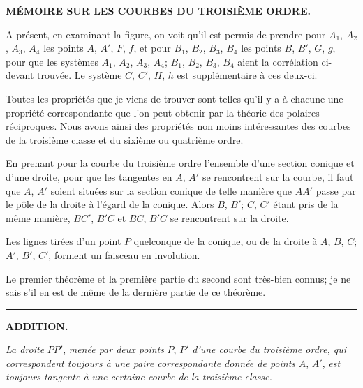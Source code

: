 \documentclass[11pt,a4paper]{book}
\begin{document}
\begin{center}
{\large\bfseries M\'{E}MOIRE SUR LES COURBES DU TROISI\`{E}ME ORDRE.}
\end{center}

\fancyfoot[C]{\thepage}

A pr\'{e}sent, en examinant la figure, on voit qu'il est permis de prendre pour $A_1$, $A_2$,
$A_3$, $A_4$ les points $A$, $A'$, $F$, $f$, et pour $B_1$, $B_2$, $B_3$, $B_4$ les points $B$, $B'$, $G$, $g$, pour que
les syst\`{e}mes $A_1$, $A_2$, $A_3$, $A_4$; $B_1$, $B_2$, $B_3$, $B_4$ aient la corr\'{e}lation ci-devant trouv\'{e}e. Le
syst\`{e}me $C$, $C'$, $H$, $h$ est suppl\'{e}mentaire \`{a} ces deux-ci.

Toutes les propri\'{e}t\'{e}s que je viens de trouver sont telles qu'il y a \`{a} chacune une
propri\'{e}t\'{e} correspondante que l'on peut obtenir par la th\'{e}orie des polaires r\'{e}ciproques.
Nous avons ainsi des propri\'{e}t\'{e}s non moins int\'{e}ressantes des courbes de la troisi\`{e}me
classe et du sixi\`{e}me ou quatri\`{e}me ordre.

En prenant pour la courbe du troisi\`{e}me ordre l'ensemble d'une section conique et
d'une droite, pour que les tangentes en $A$, $A'$ se rencontrent sur la courbe, il faut que
$A$, $A'$ soient situ\'{e}es sur la section conique de telle mani\`{e}re que $AA'$ passe par le p\^{o}le
de la droite \`{a} l'\'{e}gard de la conique. Alors $B$, $B'$; $C$, $C'$ \'{e}tant pris de la m\^{e}me mani\`{e}re,
$BC'$, $B'C$ et $BC$, $B'C$ se rencontrent sur la droite.

Les lignes tir\'{e}es d'un point $P$ quelconque de la conique, ou de la droite \`{a} $A$, $B$, $C$;
$A'$, $B'$, $C'$, forment un faisceau en involution.

Le premier th\'{e}or\`{e}me et la premi\`{e}re partie du second sont tr\`{e}s-bien connus; je ne
sais s'il en est de m\^{e}me de la derni\`{e}re partie de ce th\'{e}or\`{e}me.

\begin{center}
\rule{0.5\textwidth}{0.4pt}
\end{center}

\begin{center}
\textbf{ADDITION.}
\end{center}

\textit{La droite} $PP'$, \textit{men\'{e}e par deux points} $P$, $P'$ \textit{d'une courbe du troisi\`{e}me ordre, qui
correspondent toujours \`{a} une paire correspondante donn\'{e}e de points} $A$, $A'$, \textit{est toujours
tangente \`{a} une certaine courbe de la troisi\`{e}me classe.}
\end{document}
